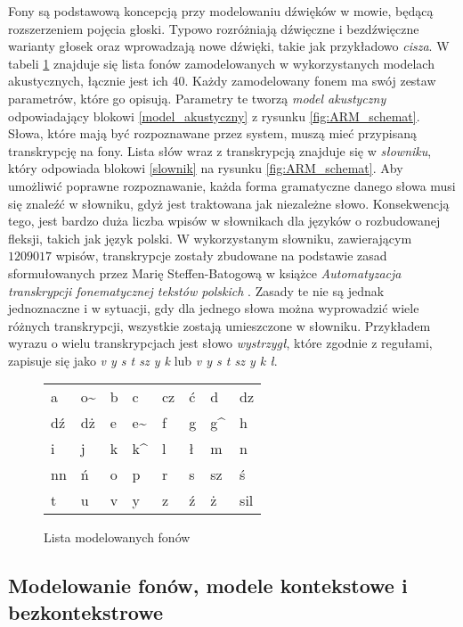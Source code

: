 \documentclass[11pt]{article}
\newcommand{\refBlock}[1]{
	\hyperref[#1]{\ref*{#1}}
}
\begin{document}
		Fony są podstawową koncepcją przy modelowaniu dźwięków w mowie, będącą rozszerzeniem pojęcia głoski. Typowo rozróżniają dźwięczne i bezdźwięczne warianty głosek oraz wprowadzają nowe dźwięki, takie jak przykładowo \textit{cisza}. W tabeli \ref{tab:phone_list} znajduje się lista fonów zamodelowanych w wykorzystanych modelach akustycznych, łącznie jest ich 40. Każdy zamodelowany fonem ma swój zestaw parametrów, które go opisują. Parametry te tworzą \textit{model akustyczny} odpowiadający blokowi \ref{model_akustyczny} z rysunku \ref{fig:ARM_schemat}. Słowa, które mają być rozpoznawane przez system, muszą mieć przypisaną transkrypcję na fony. Lista słów wraz z transkrypcją znajduje się w \textit{słowniku}, który odpowiada blokowi \refBlock{slownik} na rysunku \ref{fig:ARM_schemat}. Aby umożliwić poprawne rozpoznawanie, każda forma gramatyczne danego słowa musi się znaleźć w słowniku, gdyż jest traktowana jak niezależne słowo. Konsekwencją tego, jest bardzo duża liczba wpisów w słownikach dla języków o rozbudowanej fleksji, takich jak język polski. 
		W wykorzystanym słowniku, zawierającym $1209017$ wpisów, transkrypcje zostały zbudowane na podstawie zasad sformułowanych przez Marię Steffen-Batogową w książce \textit{Automatyzacja transkrypcji fonematycznej tekstów polskich} \cite{transkrypcja}. Zasady te nie są jednak jednoznaczne i w sytuacji, gdy dla jednego słowa można wyprowadzić wiele różnych transkrypcji, wszystkie zostają umieszczone w słowniku. Przykładem wyrazu o wielu transkrypcjach jest słowo \textit{wystrzygł}, które zgodnie z regułami, zapisuje się jako \textit{v y s t sz y k} lub \textit{v y s t sz y k ł}.  

		\begin{figure}
			\begin{tabular}{|K{1cm}K{1cm}K{1cm}K{1cm}K{1cm}K{1cm}K{1cm}K{1cm}|}
				\hline
				a  & o\~ & b & c & cz & ć & d & dz \\ 
				dź & dż & e & e\~ & f & g & g\^ & h \\
				i & j & k & k\^ & l & ł & m & n \\
				nn & ń & o & p  & r & s & sz & ś \\
				t & u & v & y & z & ź & ż & sil \\
				\hline
			\end{tabular}
			\caption{\label{tab:phone_list}Lista modelowanych fonów}
		\end{figure}
 

	\subsection{ Modelowanie fonów, modele kontekstowe i bezkontekstrowe }
		
\end{document}
